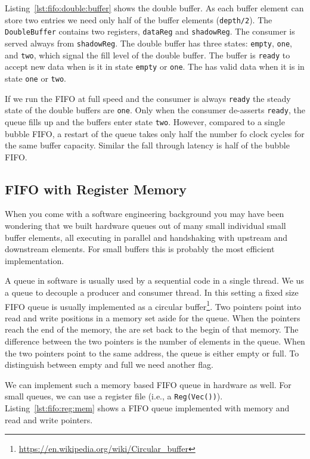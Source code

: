 \documentclass[%
    10pt,
    headinclude, footexclude,
    openright, %
    notitlepage,
    cleardoubleempty,
    headsepline,
    pointlessnumbers,
    bibtotoc, idxtotoc,
    ]{scrbook}
\newcommand{\code}[1]{{\small{\texttt{#1}}}}
\newcommand{\myref}[2]{\href{#1}{#2}}
\renewcommand{\myref}[2]{{#2}{\footnote{\url{#1}}}}
\begin{document}
Listing~\ref{lst:fifo:double:buffer} shows the double buffer. As each buffer element
can store two entries we need only half of the buffer elements (\code{depth/2}).
The \code{DoubleBuffer} contains two registers,
\code{dataReg} and \code{shadowReg}. The consumer is served always from
\code{shadowReg}. The double buffer has three states: \code{empty}, \code{one},
and \code{two}, which signal the fill level of the double buffer.
The buffer is \code{ready} to accept new data when is it in state \code{empty}
or \code{one}. The has valid data when it is in state \code{one} or \code{two}.

If we run the FIFO at full speed and the consumer is always \code{ready}
the steady state of the double buffers are \code{one}. Only when the consumer
de-asserts \code{ready}, the queue fills up and the buffers enter state \code{two}.
However, compared to a single bubble FIFO, a restart of the queue takes
only half the number fo clock cycles for the same buffer capacity.
Similar the fall through latency is half of the bubble FIFO.

\subsection{FIFO with Register Memory}

When you come with a software engineering background you may have been
wondering that we built hardware queues out of many small individual small buffer
elements, all executing in parallel and handshaking with upstream and downstream
elements. For small buffers this is probably the most efficient implementation.

A queue in software is usually used by a sequential code in a single thread.
We us a queue to decouple a producer and consumer thread.
In this setting a fixed size FIFO queue is usually implemented as a
\myref{https://en.wikipedia.org/wiki/Circular_buffer}{circular buffer}.
Two pointers point into read and write positions in a memory set aside
for the queue. When the pointers reach the end of the memory, the
are set back to the begin of that memory. The difference between the two
pointers is the number of elements in the queue. When the two pointers
point to the same address, the queue is either empty or full.
To distinguish between empty and full we need another flag.

We can implement such a memory based FIFO queue in hardware as
well. For small queues, we can use a register file (i.e., a \code{Reg(Vec())}).
Listing~\ref{lst:fifo:reg:mem} shows a FIFO queue implemented with  memory
and read and write pointers.
\end{document}
